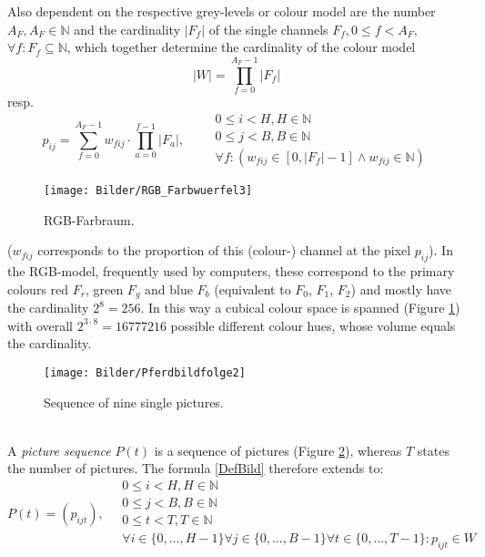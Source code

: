   \noindent Also dependent on the respective grey-levels or colour model are the \linebreak number $A_F, A_F\in\mathbb{N}$ and the cardinality $|F_f|$ of the single channels $F_f, 0\leq f < A_F,$\linebreak$\forall f:F_f\subseteq\mathbb{N}$, which together determine the cardinality of the colour model
  \begin{equation}
    |W| = \prod\limits_{f=0}^{A_F-1} |F_f|
  \end{equation} resp. 
  \begin{equation}
    p_{ij} = \sum\limits_{f=0}^{A_F-1} w_{fij}\cdot \prod\limits_{a=0}^{f-1}|F_a|,
    \qquad
    \begin{array}{l}
      0\leq i < H, H\in\mathbb{N}\\
      0\leq j < B, B\in\mathbb{N}\\
      \forall f:(w_{fij}\in[0, |F_f|-1] \wedge w_{fij}\in\mathbb{N})
    \end{array}
  \end{equation}
  \begin{figure}[!t]
    \centering
    \texttt{[image: Bilder/RGB\_Farbwuerfel3]}
    \caption{RGB-Farbraum. \cite{DMA08}}
    \label{RGBFarbwuerfel}
  \end{figure}

  \noindent ($w_{fij}$ corresponds to the proportion of this (colour-) channel at the pixel $p_{ij}$).\linebreak 
  In the RGB-model, frequently used by computers, these correspond to the primary colours red $F_r$, green $F_g$ and blue $F_b$ (equivalent to $F_0$, $F_1$, $F_2$) and mostly have the cardinality $2^8 = 256$. In this way a cubical colour space is spanned (Figure \ref{RGBFarbwuerfel}) with overall $2^{3\cdot8} = 16777216$ possible different colour hues, whose volume equals the cardinality. 
  \begin{figure}[!t]
    \centering
    \texttt{[image: Bilder/Pferdbildfolge2]}
    \caption{Sequence of nine single pictures. \cite{Pferd08}}
    \label{Pferdbildfolge}
  \end{figure}\\

  \noindent A \textit{picture sequence} $P(t)$ is a sequence of pictures (Figure \ref{Pferdbildfolge}), whereas $T$ states the number of pictures.
  The formula \ref{DefBild} therefore extends to: \cite{Ste02}
  \begingroup
  \everymath{\scriptstyle}
  \large
  \begin{equation}\label{DefBildfolge}
    P(t) = (p_{ijt}), 
    \quad\begin{array}{l}
      0\leq i < H, H\in\mathbb{N}\\
      0\leq j < B, B\in\mathbb{N}\\
      0\leq t < T, T\in\mathbb{N}\\
      \forall i\in\{0, ..., H-1\}\forall j\in\{0, ..., B-1\}\forall t\in\{0, ..., T-1\}:p_{ijt}\in W
    \end{array}
  \end{equation}
  \endgroup\\

